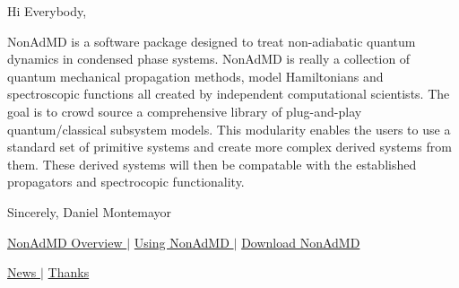 Hi Everybody,

Non\+Ad\+MD is a software package designed to treat non-\/adiabatic quantum dynamics in condensed phase systems. Non\+Ad\+MD is really a collection of quantum mechanical propagation methods, model Hamiltonians and spectroscopic functions all created by independent computational scientists. The goal is to crowd source a comprehensive library of plug-\/and-\/play quantum/classical subsystem models. This modularity enables the users to use a standard set of primitive systems and create more complex derived systems from them. These derived systems will then be compatable with the established propagators and spectrocopic functionality.

Sincerely, Daniel Montemayor

\begin{center} \hyperlink{_overview}{Non\+Ad\+MD Overview } $\vert$ \hyperlink{_interface}{Using Non\+Ad\+MD } $\vert$ \hyperlink{}{Download Non\+Ad\+MD } \end{center}  \begin{center} \hyperlink{_n_e_w_s}{News } $\vert$ \hyperlink{_t_h_a_n_k_s}{Thanks } \end{center}  